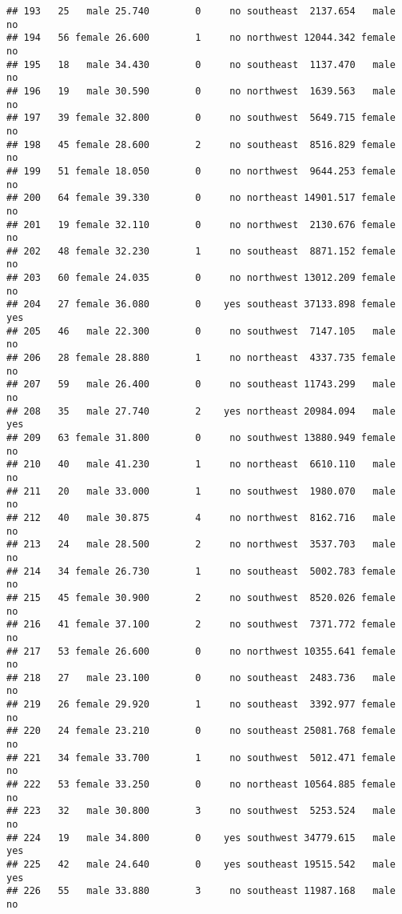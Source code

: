 \documentclass[
]{article}
\begin{document}
\begin{verbatim}
## 193   25   male 25.740        0     no southeast  2137.654   male       no
## 194   56 female 26.600        1     no northwest 12044.342 female       no
## 195   18   male 34.430        0     no southeast  1137.470   male       no
## 196   19   male 30.590        0     no northwest  1639.563   male       no
## 197   39 female 32.800        0     no southwest  5649.715 female       no
## 198   45 female 28.600        2     no southeast  8516.829 female       no
## 199   51 female 18.050        0     no northwest  9644.253 female       no
## 200   64 female 39.330        0     no northeast 14901.517 female       no
## 201   19 female 32.110        0     no northwest  2130.676 female       no
## 202   48 female 32.230        1     no southeast  8871.152 female       no
## 203   60 female 24.035        0     no northwest 13012.209 female       no
## 204   27 female 36.080        0    yes southeast 37133.898 female      yes
## 205   46   male 22.300        0     no southwest  7147.105   male       no
## 206   28 female 28.880        1     no northeast  4337.735 female       no
## 207   59   male 26.400        0     no southeast 11743.299   male       no
## 208   35   male 27.740        2    yes northeast 20984.094   male      yes
## 209   63 female 31.800        0     no southwest 13880.949 female       no
## 210   40   male 41.230        1     no northeast  6610.110   male       no
## 211   20   male 33.000        1     no southwest  1980.070   male       no
## 212   40   male 30.875        4     no northwest  8162.716   male       no
## 213   24   male 28.500        2     no northwest  3537.703   male       no
## 214   34 female 26.730        1     no southeast  5002.783 female       no
## 215   45 female 30.900        2     no southwest  8520.026 female       no
## 216   41 female 37.100        2     no southwest  7371.772 female       no
## 217   53 female 26.600        0     no northwest 10355.641 female       no
## 218   27   male 23.100        0     no southeast  2483.736   male       no
## 219   26 female 29.920        1     no southeast  3392.977 female       no
## 220   24 female 23.210        0     no southeast 25081.768 female       no
## 221   34 female 33.700        1     no southwest  5012.471 female       no
## 222   53 female 33.250        0     no northeast 10564.885 female       no
## 223   32   male 30.800        3     no southwest  5253.524   male       no
## 224   19   male 34.800        0    yes southwest 34779.615   male      yes
## 225   42   male 24.640        0    yes southeast 19515.542   male      yes
## 226   55   male 33.880        3     no southeast 11987.168   male       no

\end{verbatim}
\end{document}
